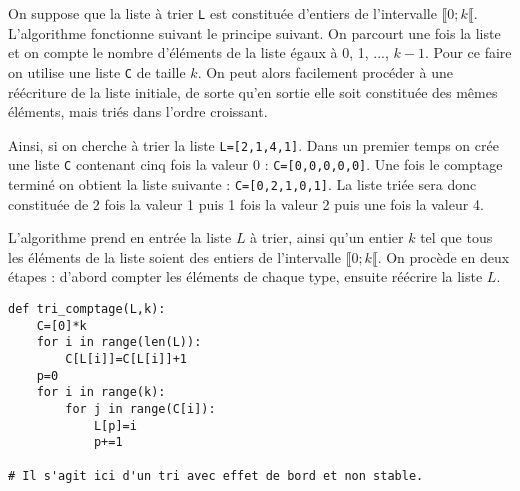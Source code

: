\setcounter{numques}{0}

On suppose que la liste à trier \texttt{L} est constituée d’entiers de l’intervalle  $\llbracket 0; k \llbracket$. L’algorithme
fonctionne suivant le principe suivant. On parcourt une fois la liste et on compte le nombre d’éléments de
la liste égaux à 0, 1, ..., $k-1$. Pour ce faire on utilise une liste \texttt{C} de taille $k$. On peut alors facilement procéder à une
réécriture de la liste initiale, de sorte qu’en sortie elle soit constituée des mêmes éléments, mais triés dans l’ordre
croissant.

Ainsi, si on cherche à trier la liste \texttt{L=[2,1,4,1]}. Dans un premier temps on crée une liste \texttt{C} contenant cinq fois la valeur 0 : \texttt{C=[0,0,0,0,0]}. Une fois le comptage terminé on obtient la liste suivante : \texttt{C=[0,2,1,0,1]}. La liste triée sera donc constituée de 2 fois la valeur 1 puis 1 fois la valeur 2 puis une fois la valeur 4.



L’algorithme prend en entrée la liste $L$ à trier, ainsi qu’un entier $k$ tel que tous les éléments de la
liste soient des entiers de l’intervalle $\llbracket 0; k \llbracket$. On procède en deux étapes : d’abord compter les éléments de chaque type,
ensuite réécrire la liste $L$.




\ifprof
\begin{lstlisting}
def tri_comptage(L,k):
    C=[0]*k
    for i in range(len(L)):
        C[L[i]]=C[L[i]]+1
    p=0
    for i in range(k):
        for j in range(C[i]):
            L[p]=i
            p+=1
            
# Il s'agit ici d'un tri avec effet de bord et non stable. 
\end{lstlisting}
\else
\fi
